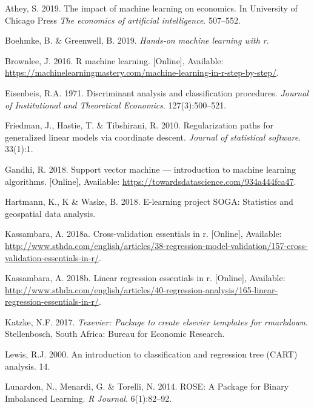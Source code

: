 \documentclass[11pt,preprint, authoryear]{elsarticle}
\numberwithin{equation}{section}
\numberwithin{figure}{section}
\numberwithin{table}{section}
\newlength{\cslhangindent}
\newenvironment{CSLReferences}%
  {\setlength{\parindent}{0pt}%
  \everypar{\setlength{\hangindent}{\cslhangindent}}\ignorespaces}%
  {\par}
\begin{document}
\hypertarget{refs}{}
\begin{CSLReferences}{1}{0}
\leavevmode\hypertarget{ref-eco}{}%
Athey, S. 2019. The impact of machine learning on economics. In
University of Chicago Press \emph{The economics of artificial
intelligence}. 507--552.

\leavevmode\hypertarget{ref-book}{}%
Boehmke, B. \& Greenwell, B. 2019. \emph{Hands-on machine learning with
r}.

\leavevmode\hypertarget{ref-ml}{}%
Brownlee, J. 2016. R machine learning. {[}Online{]}, Available:
\url{https://machinelearningmastery.com/machine-learning-in-r-step-by-step/}.

\leavevmode\hypertarget{ref-lda}{}%
Eisenbeis, R.A. 1971. Discriminant analysis and classification
procedures. \emph{Journal of Institutional and Theoretical Economics}.
127(3):500--521.

\leavevmode\hypertarget{ref-glm}{}%
Friedman, J., Hastie, T. \& Tibshirani, R. 2010. Regularization paths
for generalized linear models via coordinate descent. \emph{Journal of
statistical software}. 33(1):1.

\leavevmode\hypertarget{ref-svm}{}%
Gandhi, R. 2018. Support vector machine --- introduction to machine
learning algorithms. {[}Online{]}, Available:
\url{https://towardsdatascience.com/934a444fca47}.

\leavevmode\hypertarget{ref-ridge}{}%
Hartmann, K., K \& Waske, B. 2018. E-learning project SOGA: Statistics
and geospatial data analysis.

\leavevmode\hypertarget{ref-k}{}%
Kassambara, A. 2018a. Cross-validation essentials in r. {[}Online{]},
Available:
\url{http://www.sthda.com/english/articles/38-regression-model-validation/157-cross-validation-essentials-in-r/}.

\leavevmode\hypertarget{ref-rmse}{}%
Kassambara, A. 2018b. Linear regression essentials in r. {[}Online{]},
Available:
\url{http://www.sthda.com/english/articles/40-regression-analysis/165-linear-regression-essentials-in-r/}.

\leavevmode\hypertarget{ref-Texevier}{}%
Katzke, N.F. 2017. \emph{{Texevier}: {P}ackage to create elsevier
templates for rmarkdown}. Stellenbosch, South Africa: Bureau for
Economic Research.

\leavevmode\hypertarget{ref-cart}{}%
Lewis, R.J. 2000. An introduction to classification and regression tree
(CART) analysis. 14.

\leavevmode\hypertarget{ref-rose}{}%
Lunardon, N., Menardi, G. \& Torelli, N. 2014. {ROSE}: A {P}ackage for
{B}inary {I}mbalanced {L}earning. \emph{{R} Journal}. 6(1):82--92.


\end{CSLReferences}
\end{document}
